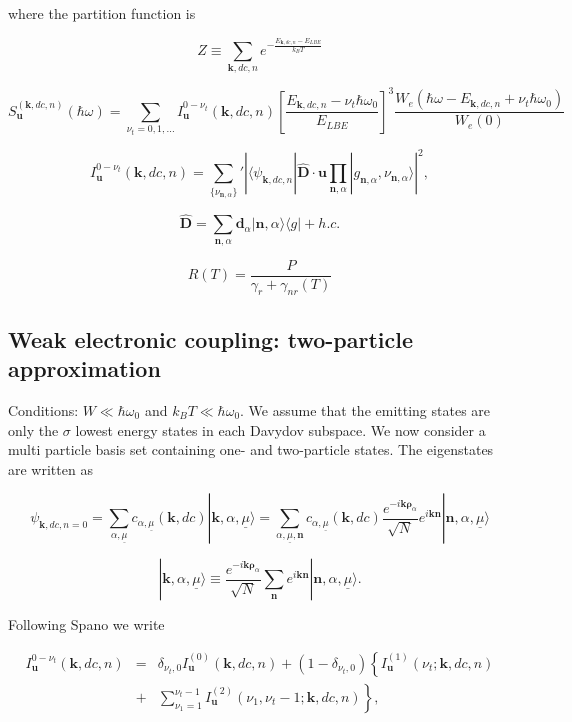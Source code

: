 \documentclass[pt12]{article}
\newcommand{\beq}{\begin{equation}}
\newcommand{\eeq}{\end{equation}}
\newcommand{\bea}{\begin{eqnarray}}
\newcommand{\eea}{\end{eqnarray}}
\newcommand{\bfk}{\mathbf{k}}
\newcommand{\bfn}{\mathbf{n}}
\newcommand{\bfu}{\mathbf{u}}
\newcommand{\umu}{\underline{\mu}}
\begin{document}
where the partition function is

\beq Z\equiv\sum_{\bfk,dc,n}e^{-\frac{E_{\bfk,dc,n}-E_{LBE}}{k_BT}}
\eeq

\beq S_\bfu^{(\bfk,dc,n)}(\hbar\omega)=\sum_{\nu_t=0,1,...}
I_\bfu^{0-\nu_t}(\bfk,dc,n)\left[\frac{E_{\bfk,dc,n}-\nu_t\hbar\omega_0}{E_{LBE}}\right]^3
\frac{W_e(\hbar\omega-E_{\bfk,dc,n}+\nu_t\hbar\omega_0)}{W_e(0)}
\eeq

\beq
I_\bfu^{0-\nu_t}(\bfk,dc,n)=\sum_{\{\nu_{\bfn,\alpha}\}}{}'\left|\langle\psi_{\bfk,dc,n}|\hat{\mathbf{D}}\cdot
\mathbf{u} \prod_{\bfn,\alpha}|g_{\bfn,\alpha},\nu_{\bfn,\alpha}
\rangle\right|^2, \eeq



\beq \hat{\mathbf{D}}=\sum_{\bfn,\alpha} \mathbf{d}_{\alpha}
|\bfn,\alpha\rangle\langle g | + h.c.\eeq

\beq R(T)=\frac{P}{\gamma_r+\gamma_{nr}(T)} \eeq



\subsection{Weak electronic coupling: two-particle approximation}

Conditions: $W\ll\hbar\omega_0$ and $k_B T \ll \hbar\omega_0$. We
assume that the emitting states are only the $\sigma$ lowest energy
 states in each Davydov subspace. We now consider a multi particle basis set containing one- and two-particle states. The eigenstates are written as  

\beq \psi_{\bfk,dc,n=0}=\sum_{\alpha,\umu} c_{\alpha,\umu}(\bfk,dc)
|\bfk,\alpha,\umu\rangle=\sum_{\alpha,\umu,\bfn}
c_{\alpha,\umu}(\bfk,dc)  \frac{e^{-i\bfk
\mathbf{\rho}_\alpha}}{\sqrt{N}} e^{i \bfk \bfn} | \bfn,\alpha,\umu
\rangle  \eeq

\begin{equation}
|\bfk,\alpha,\umu\rangle \equiv \frac{e^{-i\bfk
\mathbf{\rho}_\alpha}}{\sqrt{N}} \sum_{\bfn} e^{i \bfk \bfn} |
\bfn,\alpha,\umu \rangle .
\end{equation}

Following Spano we write

\bea
I_\bfu^{0-\nu_t}(\bfk,dc,n)&=&\delta_{\nu_t,0}I_\bfu^{(0)}(\bfk,dc,n)+\left(1-\delta_{\nu_t,0}\right)\left\{ I_\bfu^{(1)}(\nu_t;\bfk,dc,n) \right. \\
&+& \left.  \sum_{\nu_1=1}^{\nu_t-1}  I_\bfu^{(2)}(\nu_1,\nu_t-1;\bfk,dc,n) \right\} ,
\eea
\end{document}
